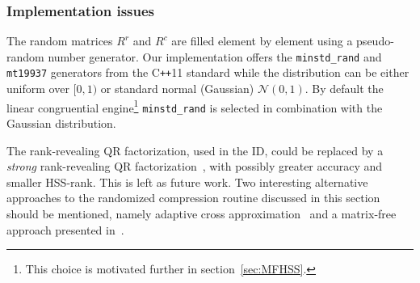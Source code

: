 \documentclass{article}
\newcommand{\ignore}[1]{}
\begin{document}
\ignore{
\subsubsection{Improving the samples by power iteration}\label{sec:power_iteration}
When the singular values of $A$ do not decay fast or $A$ is very
large, the samples $S^r$ and $S^c$ can be poor approximations of the
column and row spaces of $A$. In that case, sampling can be done using
$B = (A A^*)^q A$ instead of $A$, with $q$ a small integer. Note that
$B$ has the same singular vectors as $A$ but it's singular values
$\sigma_j(B) = \sigma_j(A)^{2q+1}$, $j=1,2,\dots$ decay much
faster. Let
\begin{equation}
  S^r = \left( A A^* \right)^q A R = A R^r \quad \textrm{and} \quad
  S^c = \left( A^* A \right)^q A^* R = A^* R^c , \label{eq:poweritsample}
\end{equation}
then Algorithm~\ref{algo:compress} can be called with $R^r = A^*
\left( A A^* \right)^{q-1} A R$, $R^c = A \left( A^* A \right)^{q-1}
A^* R$. Typically, $q=1$ or $2$ should be sufficient, so when a fast
matrix-vector multiplication is available for $A$, the additional
computational cost is not too bad. However, it might also be necessary
to reorthogonalize the random vectors between each application of $A$
and $A^*$. See~\cite{halko2011finding} for more info.
}

\subsubsection{Implementation issues}
The random matrices $R^r$ and $R^c$ are filled element by element
using a pseudo-random number generator. Our implementation offers the
\verb+minstd_rand+ and \verb+mt19937+ generators from the
C\texttt{++}11 standard while the distribution can be either uniform
over $[0,1)$ or standard normal (Gaussian) $\mathcal{N}(0,1)$. By
default the linear congruential engine\footnote{This choice is
  motivated further in section~\ref{sec:MFHSS}.} \verb+minstd_rand+ is
selected in combination with the Gaussian distribution.

\ignore{ Alternatively, so-called \emph{structured} random matrices,
  for instance based on the subsampled randomized Fourier or Hadamard
  transforms~\cite{halko2011finding}, might be considered for
  $R$. Such matrices allow faster $AR$ evaluation when $A$ is a dense
  matrix.}

The rank-revealing QR factorization, used in the ID, could be replaced
by a \emph{strong} rank-revealing QR
factorization~\cite{gu1996efficient}, with possibly greater accuracy
and smaller HSS-rank. This is left as future work. Two interesting
alternative approaches to the randomized compression routine discussed
in this section should be mentioned, namely adaptive cross
approximation~\cite{bebendorf2000approximation} and a matrix-free
approach presented in~\cite{lin2011fast}.
\end{document}
